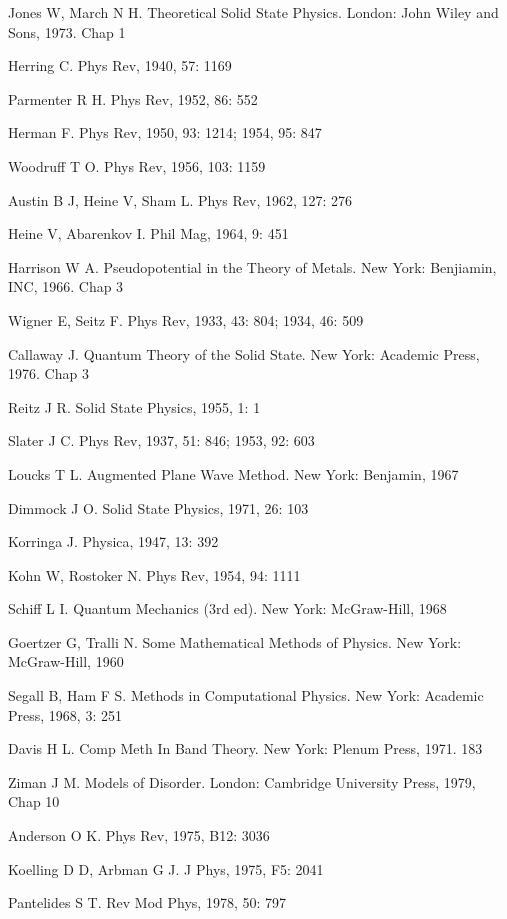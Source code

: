 \begin{canKao}
\begin{enumerate}[label={[\arabic*]}, leftmargin=2.2em, itemsep=0pt]
\item Jones W, March N H. Theoretical Solid State Physics. London: John Wiley and Sons, 1973. Chap 1
\item Herring C. Phys Rev, 1940, 57: 1169
\item Parmenter R H. Phys Rev, 1952, 86: 552
\item Herman F. Phys Rev, 1950, 93: 1214; 1954, 95: 847
\item Woodruff T O. Phys Rev, 1956, 103: 1159
\item Austin B J, Heine V, Sham L. Phys Rev, 1962, 127: 276
\item Heine V, Abarenkov I. Phil Mag, 1964, 9: 451
\item Harrison W A. Pseudopotential in the Theory of Metals. New York: Benjiamin, INC, 1966. Chap 3
\item Wigner E, Seitz F. Phys Rev, 1933, 43: 804; 1934, 46: 509
\item Callaway J. Quantum Theory of the Solid State. New York: Academic Press, 1976. Chap 3
\item Reitz J R. Solid State Physics, 1955, 1: 1
\item Slater J C. Phys Rev, 1937, 51: 846; 1953, 92: 603
\item Loucks T L. Augmented Plane Wave Method. New York: Benjamin, 1967
\item Dimmock J O. Solid State Physics, 1971, 26: 103
\item Korringa J. Physica, 1947, 13: 392
\item Kohn W, Rostoker N. Phys Rev, 1954, 94: 1111
\item Schiff L I. Quantum Mechanics (3rd ed). New York: McGraw-Hill, 1968
\item Goertzer G, Tralli N. Some Mathematical Methods of Physics. New York: McGraw-Hill, 1960
\item Segall B, Ham F S. Methods in Computational Physics. New York: Academic Press, 1968, 3: 251
\item Davis H L. Comp Meth In Band Theory. New York: Plenum Press, 1971. 183
\item Ziman J M. Models of Disorder. London: Cambridge University Press, 1979, Chap 10
\item Anderson O K. Phys Rev, 1975, B12: 3036
\item Koelling D D, Arbman G J. J Phys, 1975, F5: 2041
\item Pantelides S T. Rev Mod Phys, 1978, 50: 797

\end{enumerate}
\end{canKao}
